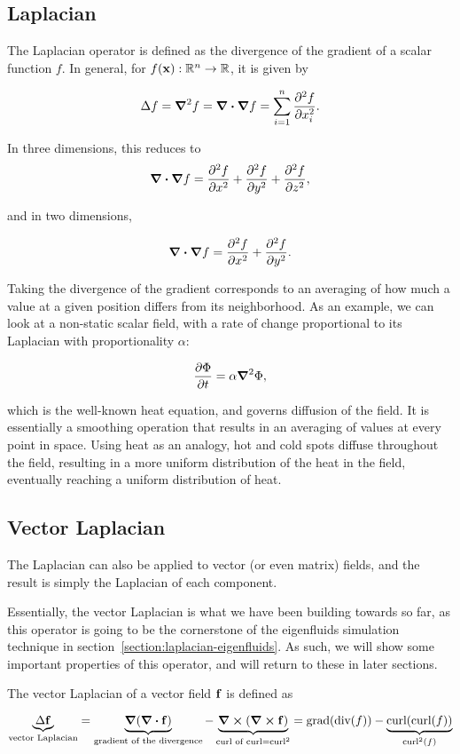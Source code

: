 \subsection*{Laplacian}
The Laplacian operator is defined as the divergence of the gradient of a scalar
function $f$. In general, for $f(\vb{x}): \mathbb{R}^n \to \mathbb{R}$, it is
given by

    $$\Delta f = \grad^2{f} = \grad \vdot \grad f = \sum_{i=1}^n
\pdv[2]{f}{x_i}.$$

In three dimensions, this reduces to 
$$\grad \vdot \grad f = \pdv[2]{f}{x} + \pdv[2]{f}{y} + \pdv[2]{f}{z},$$

and in two dimensions,

$$ \grad \vdot \grad f = \pdv[2]{f}{x} + \pdv[2]{f}{y}.$$

Taking the divergence of the gradient corresponds to an averaging of how much
a value at a given position differs from its neighborhood. As an example, we
can look at a non-static scalar field, with a rate of change proportional to
its Laplacian with proportionality $\alpha$:

$$
    \pdv{\Phi}{t} = \alpha \grad^2\Phi,
$$

which is the well-known heat equation, and governs diffusion of the field. It is
essentially a smoothing operation that results in an averaging of values at
every point in space. Using heat as an analogy, hot and cold spots diffuse
throughout the field, resulting in a more uniform distribution of the heat in
the field, eventually reaching a uniform distribution of heat.

\subsection*{Vector Laplacian}
\label{section:vector-laplacian}
The Laplacian can also be applied to vector (or even matrix) fields, and the
result is simply the Laplacian of each component.

Essentially, the vector Laplacian is what we have been building towards so far,
as this operator is going to be the cornerstone of the eigenfluids simulation
technique in section~\ref{section:laplacian-eigenfluids}. As such, we will show
some important properties of this operator, and will return to these in later
sections.

The vector Laplacian of a vector field $\vb{f}$ is defined as

$$\underbrace{\Delta \vb{f}}_{\text{vector Laplacian}}
= \underbrace{\grad(\div{\vb{f}})}_{\text{gradient of the divergence}}
- \underbrace{\curl(\curl{\vb{f}})}_{\text{curl of curl} = \text{curl}^2}
= \text{grad}(\text{div}(f))
- \underbrace{\text{curl}(\text{curl}(f))}_{\text{curl}^2(f)}$$

